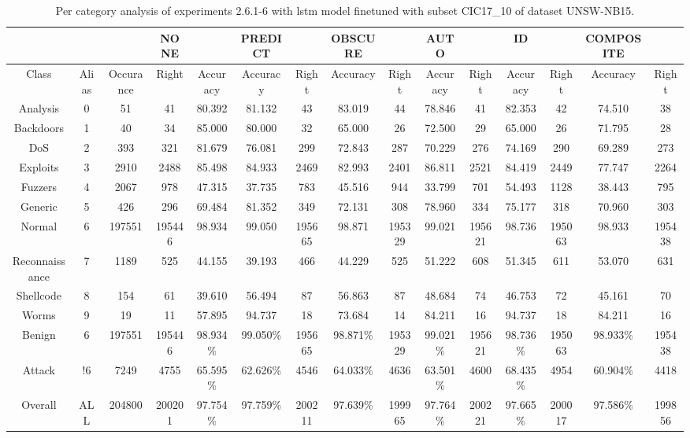 \begin{table}[htb]
    \centering
    \begin{tabular}{@{}ccccccccccccccc@{}}
        \toprule
         &  &  & NONE &  & PREDICT &  & OBSCURE &  & AUTO &  & ID &  & COMPOSITE &  \\
        \midrule
        Class &  Alias &  Occurance &  Right &  Accuracy &  Accuracy &  Right &  Accuracy &  Right &  Accuracy &  Right &  Accuracy &  Right &  Accuracy &  Right \\
        Analysis &  0 &  51 &  41 &  80.392 &  81.132 &  43 &  83.019 &  44 &  78.846 &  41 &  82.353 &  42 &  74.510 &  38 \\
        Backdoors &  1 &  40 &  34 &  85.000 &  80.000 &  32 &  65.000 &  26 &  72.500 &  29 &  65.000 &  26 &  71.795 &  28 \\
        DoS &  2 &  393 &  321 &  81.679 &  76.081 &  299 &  72.843 &  287 &  70.229 &  276 &  74.169 &  290 &  69.289 &  273 \\
        Exploits &  3 &  2910 &  2488 &  85.498 &  84.933 &  2469 &  82.993 &  2401 &  86.811 &  2521 &  84.419 &  2449 &  77.747 &  2264 \\
        Fuzzers &  4 &  2067 &  978 &  47.315 &  37.735 &  783 &  45.516 &  944 &  33.799 &  701 &  54.493 &  1128 &  38.443 &  795 \\
        Generic &  5 &  426 &  296 &  69.484 &  81.352 &  349 &  72.131 &  308 &  78.960 &  334 &  75.177 &  318 &  70.960 &  303 \\
        Normal &  6 &  197551 &  195446 &  98.934 &  99.050 &  195665 &  98.871 &  195329 &  99.021 &  195621 &  98.736 &  195063 &  98.933 &  195438 \\
        Reconnaissance &  7 &  1189 &  525 &  44.155 &  39.193 &  466 &  44.229 &  525 &  51.222 &  608 &  51.345 &  611 &  53.070 &  631 \\
        Shellcode &  8 &  154 &  61 &  39.610 &  56.494 &  87 &  56.863 &  87 &  48.684 &  74 &  46.753 &  72 &  45.161 &  70 \\
        Worms &  9 &  19 &  11 &  57.895 &  94.737 &  18 &  73.684 &  14 &  84.211 &  16 &  94.737 &  18 &  84.211 &  16 \\
        Benign &  6 &  197551 &  195446 &  98.934\% &  99.050\% &  195665 &  98.871\% &  195329 &  99.021\% &  195621 &  98.736\% &  195063 &  98.933\% &  195438 \\
        Attack &  !6 &  7249 &  4755 &  65.595\% &  62.626\% &  4546 &  64.033\% &  4636 &  63.501\% &  4600 &  68.435\% &  4954 &  60.904\% &  4418 \\
        Overall &  ALL &  204800 &  200201 &  97.754\% &  97.759\% &  200211 &  97.639\% &  199965 &  97.764\% &  200221 &  97.665\% &  200017 &  97.586\% &  199856 \\
        \bottomrule
    \end{tabular}
    \caption{Per category analysis of experiments 2.6.1-6 with \gls{lstm} model finetuned with subset CIC17\_10 of dataset UNSW-NB15.}
    \label{table:results:lstm:class_flows15_subset}
\end{table}